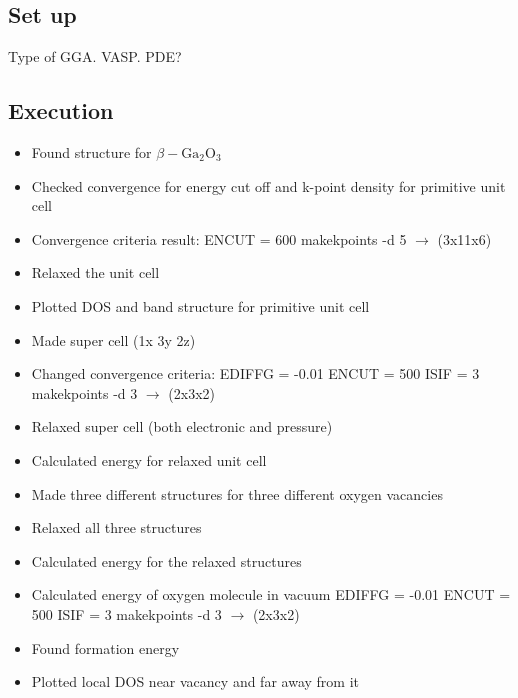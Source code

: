 \subsection{Set up}

Type of GGA.
VASP. PDE?


\subsection{Execution}

\begin{itemize}

\item Found structure for $\beta- \text{Ga}_2\text{O}_3$

\item Checked convergence for energy cut off and k-point density for primitive unit cell

\item Convergence criteria result:
\subitem ENCUT = 600
\subitem makekpoints -d 5 $\rightarrow$ (3x11x6)

\item Relaxed the unit cell

\item Plotted DOS and band structure for primitive unit cell

\item Made super cell (1x 3y 2z)

\item Changed convergence criteria:
\subitem EDIFFG = -0.01
\subitem ENCUT = 500
\subitem ISIF = 3
\subitem makekpoints -d 3 $\rightarrow$ (2x3x2)

\item Relaxed super cell (both electronic and pressure)

\item Calculated energy for relaxed unit cell

\item Made three different structures for three different oxygen vacancies

\item Relaxed all three structures

\item Calculated energy for the relaxed structures

\item Calculated energy of oxygen molecule in vacuum
\subitem EDIFFG = -0.01
\subitem ENCUT = 500
\subitem ISIF = 3
\subitem makekpoints -d 3 $\rightarrow$ (2x3x2)

\item Found formation energy 

\item Plotted local DOS near vacancy and far away from it

\end{itemize}

